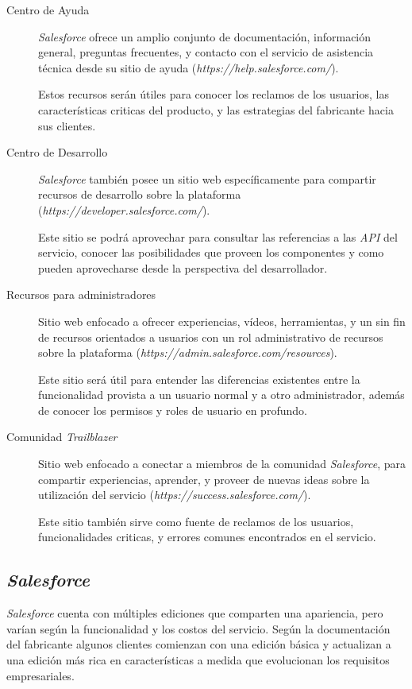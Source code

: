 \begin{description}
\item [Centro de Ayuda] \emph{Salesforce} ofrece un amplio conjunto de
documentación, información general, preguntas frecuentes, y contacto con el
servicio de asistencia técnica desde su sitio de ayuda
(\emph{https://help.salesforce.com/}).

Estos recursos serán útiles para conocer los reclamos de los usuarios, las
características criticas del producto, y las estrategias del fabricante hacia
sus clientes.

\item [Centro de Desarrollo] \emph{Salesforce} también posee un sitio web
específicamente para compartir recursos de desarrollo sobre la plataforma
(\emph{https://developer.salesforce.com/}).

Este sitio se podrá aprovechar para consultar las referencias a las \emph{API}
del servicio, conocer las posibilidades que proveen los componentes y como
pueden aprovecharse desde la perspectiva del desarrollador.

\item [Recursos para administradores] Sitio web enfocado a ofrecer experiencias,
vídeos, herramientas, y un sin fin de recursos orientados a usuarios con un rol
administrativo de recursos sobre la plataforma
(\emph{https://admin.salesforce.com/resources}).

Este sitio será útil para entender las diferencias existentes entre la
funcionalidad provista a un usuario normal y a otro administrador, además de
conocer los permisos y roles de usuario en profundo.

\item [Comunidad \emph{Trailblazer}] Sitio web enfocado a conectar a miembros de
la comunidad \emph{Salesforce}, para compartir experiencias, aprender, y proveer
de nuevas ideas sobre la utilización del servicio
(\emph{https://success.salesforce.com/}).

Este sitio también sirve como fuente de reclamos de los usuarios,
funcionalidades criticas, y errores comunes encontrados en el servicio.

\end{description}

\subsection{\emph{Salesforce}}
\emph{Salesforce} cuenta con múltiples ediciones que comparten una apariencia,
pero varían según la funcionalidad y los costos del servicio. Según la
documentación del fabricante algunos clientes comienzan con una edición básica y
actualizan a una edición más rica en características a medida que evolucionan
los requisitos empresariales.

